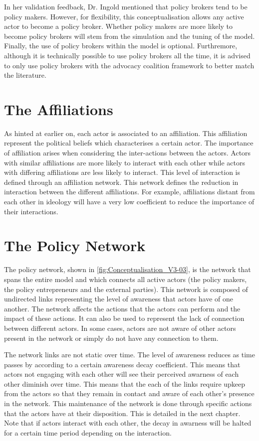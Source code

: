 In her validation feedback, Dr. Ingold mentioned that policy brokers tend to be policy makers. However, for flexibility, this conceptualisation allows any active actor to become a policy broker. Whether policy makers are more likely to become policy brokers will stem from the simulation and the tuning of the model. Finally, the use of policy brokers within the model is optional. Furthremore, although it is technically possible to use policy brokers all the time, it is advised to only use policy brokers with the advocacy coalition framework to better match the literature.

%
\section{The Affiliations}
\label{sec:affiliation}

As hinted at earlier on, each actor is associated to an affiliation. This affiliation represent the political beliefs which characterises a certain actor. The importance of affiliation arises when considering the inter-actions between the actors. Actors with similar affiliations are more likely to interact with each other while actors with differing affiliations are less likely to interact. This level of interaction is defined through an affiliation network. This network defines the reduction in interaction between the different affiliations. For example, affiliations distant from each other in ideology will have a very low coefficient to reduce the importance of their interactions.

%
\section{The Policy Network}
\label{sec:policyNetwork}

The policy network, shown in \autoref{fig:Conceptualisation_V3-03}, is the network that spans the entire model and which connects all active actors (the policy makers, the policy entrepreneurs and the external parties). This network is composed of undirected links representing the level of awareness that actors have of one another. The network affects the actions that the actors can perform and the impact of these actions. It can also be used to represent the lack of connection between different actors. In some cases, actors are not aware of other actors present in the network or simply do not have any connection to them.

The network links are not static over time. The level of awareness reduces as time passes by according to a certain awareness decay coefficient. This means that actors not engaging with each other will see their perceived awarness of each other diminish over time. This means that the each of the links require upkeep from the actors so that they remain in contact and aware of each other's presence in the network. This maintenance of the network is done through specific actions that the actors have at their disposition. This is detailed in the next chapter. Note that if actors interact with each other, the decay in awarness will be halted for a certain time period depending on the interaction.

